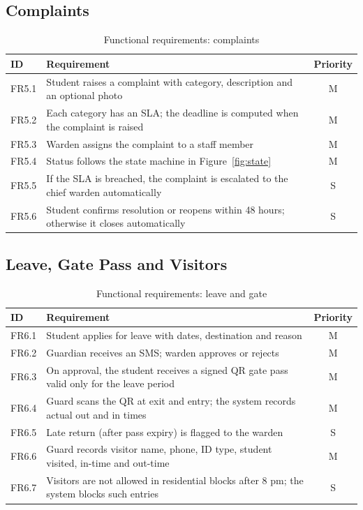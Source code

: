 \documentclass[11pt,a4paper]{report}
\begin{document}
\subsection{Complaints}
\begin{table}[H]
\centering\small
\caption{Functional requirements: complaints}\label{tab:fr-comp}
\begin{tabularx}{\textwidth}{lLc}
\toprule
\textbf{ID} & \textbf{Requirement} & \textbf{Priority}\\
\midrule
FR5.1 & Student raises a complaint with category, description and an optional photo & M\\
FR5.2 & Each category has an SLA; the deadline is computed when the complaint is raised & M\\
FR5.3 & Warden assigns the complaint to a staff member & M\\
FR5.4 & Status follows the state machine in Figure~\ref{fig:state} & M\\
FR5.5 & If the SLA is breached, the complaint is escalated to the chief warden automatically & S\\
FR5.6 & Student confirms resolution or reopens within 48 hours; otherwise it closes automatically & S\\
\bottomrule
\end{tabularx}
\end{table}

\subsection{Leave, Gate Pass and Visitors}
\begin{table}[H]
\centering\small
\caption{Functional requirements: leave and gate}\label{tab:fr-gate}
\begin{tabularx}{\textwidth}{lLc}
\toprule
\textbf{ID} & \textbf{Requirement} & \textbf{Priority}\\
\midrule
FR6.1 & Student applies for leave with dates, destination and reason & M\\
FR6.2 & Guardian receives an SMS; warden approves or rejects & M\\
FR6.3 & On approval, the student receives a signed QR gate pass valid only for the leave period & M\\
FR6.4 & Guard scans the QR at exit and entry; the system records actual out and in times & M\\
FR6.5 & Late return (after pass expiry) is flagged to the warden & S\\
FR6.6 & Guard records visitor name, phone, ID type, student visited, in-time and out-time & M\\
FR6.7 & Visitors are not allowed in residential blocks after 8 pm; the system blocks such entries & S\\
\bottomrule
\end{tabularx}
\end{table}
\end{document}
